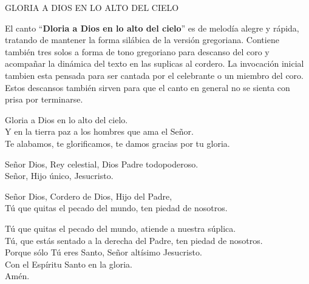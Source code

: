 \documentclass[12pt, letterpaper]{report}
\begin{document}



    \begin{center}
      {\large GLORIA A DIOS EN LO ALTO DEL CIELO}
    \end{center}

    El canto ``\textbf{Dloria a Dios en lo alto del cielo}'' es de melod\'ia alegre y r\'apida, tratando de mantener la forma sil\'abica de la versi\'on gregoriana. Contiene tambi\'en tres solos a forma de tono gregoriano para descanso del coro y acompa\~nar la din\'amica del texto en las suplicas al cordero. La invocaci\'on inicial tambien esta pensada para ser cantada por el celebrante o un miembro del coro.  Estos descansos tambi\'en sirven para que el canto en general no se sienta con prisa por terminarse.

    \noindent
    Gloria a Dios en lo alto del cielo.\\
    Y en la tierra paz a los hombres que ama el Se\~nor. \\
    Te alabamos, te glorificamos, te damos gracias por tu gloria.

    \noindent
    Se\~nor Dios, Rey celestial, Dios Padre todopoderoso. \\
    Se\~nor, Hijo \'unico, Jesucristo.

    \noindent
    Se\~nor Dios, Cordero de Dios, Hijo del Padre, \\
    T\'u que quitas el pecado del mundo, ten piedad de nosotros.

    \noindent
    T\'u que quitas el pecado del mundo, atiende a nuestra s\'uplica. \\
    T\'u, que est\'as sentado a la derecha del Padre, ten piedad de nosotros.\\
    Porque s\'olo T\'u eres Santo, Se\~nor alt\'isimo Jesucristo. \\
    Con el Esp\'iritu Santo en la gloria.\\
    Am\'en.
    \clearpage
\end{document}
